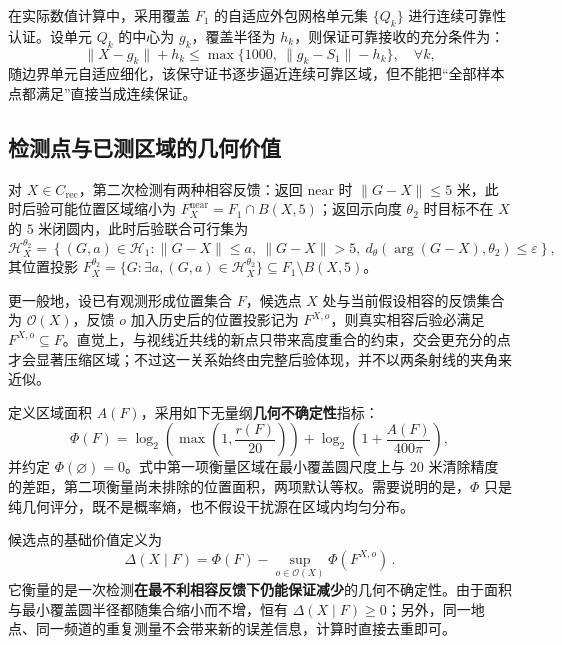 \documentclass[withoutpreface]{cumcmthesis}
\begin{document}
在实际数值计算中，采用覆盖 $F_1$ 的自适应外包网格单元集 $\{Q_k\}$ 进行连续可靠性认证。设单元 $Q_k$ 的中心为 $g_k$，覆盖半径为 $h_k$，则保证可靠接收的充分条件为：
\begin{equation}\label{eq:reliable_cert}
\|X - g_k\| + h_k \le \max\{1000,\ \|g_k - S_1\| - h_k\}, \quad \forall k,
\end{equation}
随边界单元自适应细化，该保守证书逐步逼近连续可靠区域，但不能把“全部样本点都满足”直接当成连续保证。

\subsection{检测点与已测区域的几何价值}

对 $X \in C_{\mathrm{rec}}$，第二次检测有两种相容反馈：返回 $\mathrm{near}$ 时 $\|G - X\| \le 5$ 米，此时后验可能位置区域缩小为 $F_X^{\mathrm{near}} = F_1 \cap B(X, 5)$；返回示向度 $\theta_2$ 时目标不在 $X$ 的 $5$ 米闭圆内，此时后验联合可行集为
\begin{equation}\label{eq:H_direction}
\mathcal H_X^{\theta_2} = \left\{ (G,a) \in \mathcal H_1 : \|G - X\| \le a,\ \|G - X\| > 5,\ d_\theta(\operatorname{arg}(G - X), \theta_2) \le \varepsilon \right\},
\end{equation}
其位置投影 $F_X^{\theta_2} = \{G : \exists a, (G,a) \in \mathcal H_X^{\theta_2}\} \subseteq F_1 \setminus B(X, 5)$。

更一般地，设已有观测形成位置集合 $F$，候选点 $X$ 处与当前假设相容的反馈集合为 $\mathcal O(X)$，反馈 $o$ 加入历史后的位置投影记为 $F^{X,o}$，则真实相容后验必满足 $F^{X,o}\subseteq F$。直觉上，与视线近共线的新点只带来高度重合的约束，交会更充分的点才会显著压缩区域；不过这一关系始终由完整后验体现，并不以两条射线的夹角来近似。

定义区域面积 $A(F)$，采用如下无量纲\textbf{几何不确定性}指标：
\begin{equation}\label{eq:phi}
\Phi(F)=\log_2\!\left(\max\left(1,\frac{r(F)}{20}\right)\right)
+\log_2\!\left(1+\frac{A(F)}{400\pi}\right),
\end{equation}
并约定 $\Phi(\varnothing)=0$。式中第一项衡量区域在最小覆盖圆尺度上与 $20$ 米清除精度的差距，第二项衡量尚未排除的位置面积，两项默认等权。需要说明的是，$\Phi$ 只是纯几何评分，既不是概率熵，也不假设干扰源在区域内均匀分布。

候选点的基础价值定义为
\begin{equation}\label{eq:delta}
\boxed{
\Delta(X\mid F)=\Phi(F)-\sup_{o \in \mathcal O(X)}\Phi(F^{X,o})
}\,.
\end{equation}
它衡量的是一次检测\textbf{在最不利相容反馈下仍能保证减少}的几何不确定性。由于面积与最小覆盖圆半径都随集合缩小而不增，恒有 $\Delta(X\mid F)\ge0$；另外，同一地点、同一频道的重复测量不会带来新的误差信息，计算时直接去重即可。
\end{document}
